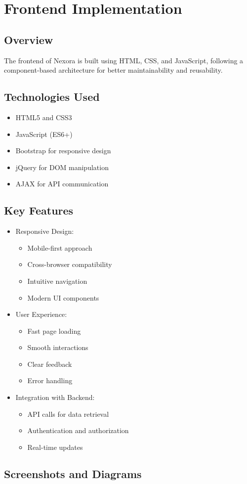 \chapter{Frontend Implementation}

\section{Overview}
The frontend of Nexora is built using HTML, CSS, and JavaScript, following a component-based architecture for better maintainability and reusability.

\section{Technologies Used}
\begin{itemize}
    \item HTML5 and CSS3
    \item JavaScript (ES6+)
    \item Bootstrap for responsive design
    \item jQuery for DOM manipulation
    \item AJAX for API communication
\end{itemize}

\section{Key Features}
\begin{itemize}
    \item Responsive Design:
    \begin{itemize}
        \item Mobile-first approach
        \item Cross-browser compatibility
        \item Intuitive navigation
        \item Modern UI components
    \end{itemize}
    \item User Experience:
    \begin{itemize}
        \item Fast page loading
        \item Smooth interactions
        \item Clear feedback
        \item Error handling
    \end{itemize}
    \item Integration with Backend:
    \begin{itemize}
        \item API calls for data retrieval
        \item Authentication and authorization
        \item Real-time updates
    \end{itemize}
\end{itemize}

\section{Screenshots and Diagrams}
